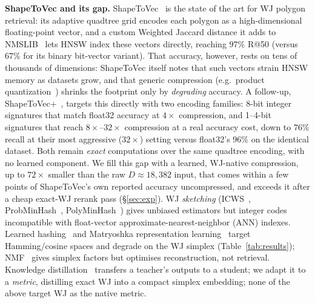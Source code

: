 \documentclass[conference]{IEEEtran}
\begin{document}
\textbf{ShapeToVec and its gap.} ShapeToVec~\cite{shape2vec} is the state of the art
for WJ polygon retrieval: its adaptive quadtree grid encodes each polygon as a
high-dimensional floating-point vector, and a custom Weighted Jaccard
distance it adds to NMSLIB~\cite{boytsov13} lets HNSW index these vectors directly,
reaching $97\%$ R@50 (versus $67\%$ for its binary bit-vector variant). That accuracy,
however, rests on tens of thousands of dimensions: ShapeToVec itself notes that such
vectors strain HNSW memory as datasets grow, and that generic compression
(e.g.\ product quantization~\cite{jegou10pq}) shrinks the footprint only by
\emph{degrading} accuracy. A follow-up, ShapeToVec+~\cite{shapetovecplus26}, targets
this directly with two encoding families: 8-bit integer signatures that match
float32 accuracy at $4\times$ compression, and 1--4-bit signatures that reach
$8\times$--$32\times$ compression at a real accuracy cost, down to $76\%$ recall at
their most aggressive ($32\times$) setting versus float32's $96\%$ on the identical
dataset. Both remain \emph{exact} computations over the same quadtree encoding, with
no learned component.
We fill this gap with a learned, WJ-native compression, up to $72\times$ smaller than
the raw $D{\approx}18{,}382$ input, that comes within a few points of ShapeToVec's own
reported accuracy uncompressed, and exceeds it after a cheap exact-WJ rerank pass
(\S\ref{sec:exp}).
WJ \emph{sketching} (ICWS~\cite{ioffe10}, ProbMinHash~\cite{probminhash20},
PolyMinHash~\cite{polyminhash25}) gives unbiased estimators but integer codes
incompatible with float-vector approximate-nearest-neighbor (ANN) indexes. Learned
hashing~\cite{hashsurvey14,deephashsurvey22} and Matryoshka representation
learning~\cite{matryoshka22} target Hamming/cosine spaces and degrade on the WJ
simplex (Table~\ref{tab:results}); NMF~\cite{nmf99} gives simplex factors but
optimises reconstruction, not retrieval. Knowledge distillation~\cite{hinton15}
transfers a teacher's outputs to a student; we adapt it to a \emph{metric},
distilling exact WJ into a compact simplex embedding; none of the above target
WJ as the native metric.
\end{document}
